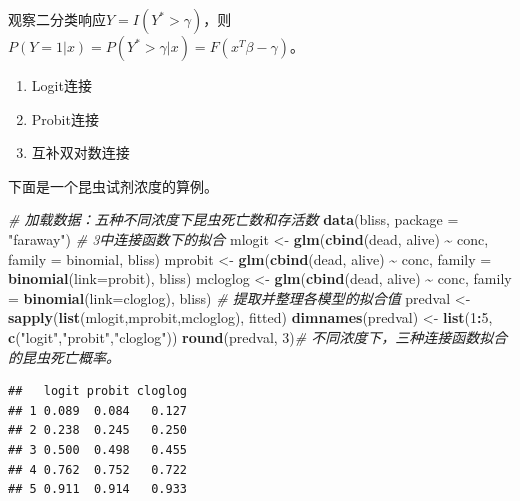 \documentclass[
]{book}
\newenvironment{Shaded}{\begin{snugshade}}{\end{snugshade}}
\newcommand{\AttributeTok}[1]{\textcolor[rgb]{0.13,0.29,0.53}{#1}}
\newcommand{\CommentTok}[1]{\textcolor[rgb]{0.56,0.35,0.01}{\textit{#1}}}
\newcommand{\DecValTok}[1]{\textcolor[rgb]{0.00,0.00,0.81}{#1}}
\newcommand{\FunctionTok}[1]{\textcolor[rgb]{0.13,0.29,0.53}{\textbf{#1}}}
\newcommand{\NormalTok}[1]{#1}
\newcommand{\OtherTok}[1]{\textcolor[rgb]{0.56,0.35,0.01}{#1}}
\newcommand{\SpecialCharTok}[1]{\textcolor[rgb]{0.81,0.36,0.00}{\textbf{#1}}}
\newcommand{\StringTok}[1]{\textcolor[rgb]{0.31,0.60,0.02}{#1}}
\providecommand{\tightlist}{%
  \setlength{\itemsep}{0pt}\setlength{\parskip}{0pt}}
\begin{document}
观察二分类响应\(Y = I(Y^* > \gamma)\)，则\(P(Y=1|x) = P(Y^* > \gamma|x) = F(x^T\beta - \gamma)\)。

\begin{enumerate}
\def\labelenumi{\arabic{enumi}.}
\tightlist
\item
  Logit连接
\item
  Probit连接
\item
  互补双对数连接
\end{enumerate}

下面是一个昆虫试剂浓度的算例。

\begin{Shaded}
\begin{Highlighting}[]
\CommentTok{\# 加载数据：五种不同浓度下昆虫死亡数和存活数}
\FunctionTok{data}\NormalTok{(bliss, }\AttributeTok{package =} \StringTok{"faraway"}\NormalTok{)}
\CommentTok{\# 3中连接函数下的拟合}
\NormalTok{mlogit }\OtherTok{\textless{}{-}} \FunctionTok{glm}\NormalTok{(}\FunctionTok{cbind}\NormalTok{(dead, alive) }\SpecialCharTok{\textasciitilde{}}\NormalTok{ conc, }\AttributeTok{family =}\NormalTok{ binomial, bliss)}
\NormalTok{mprobit }\OtherTok{\textless{}{-}} \FunctionTok{glm}\NormalTok{(}\FunctionTok{cbind}\NormalTok{(dead, alive) }\SpecialCharTok{\textasciitilde{}}\NormalTok{ conc, }\AttributeTok{family =} \FunctionTok{binomial}\NormalTok{(}\AttributeTok{link=}\NormalTok{probit), bliss)}
\NormalTok{mcloglog }\OtherTok{\textless{}{-}} \FunctionTok{glm}\NormalTok{(}\FunctionTok{cbind}\NormalTok{(dead, alive) }\SpecialCharTok{\textasciitilde{}}\NormalTok{ conc, }\AttributeTok{family =} \FunctionTok{binomial}\NormalTok{(}\AttributeTok{link=}\NormalTok{cloglog), bliss)}
\CommentTok{\# 提取并整理各模型的拟合值}
\NormalTok{predval }\OtherTok{\textless{}{-}} \FunctionTok{sapply}\NormalTok{(}\FunctionTok{list}\NormalTok{(mlogit,mprobit,mcloglog), fitted)}
\FunctionTok{dimnames}\NormalTok{(predval) }\OtherTok{\textless{}{-}} \FunctionTok{list}\NormalTok{(}\DecValTok{1}\SpecialCharTok{:}\DecValTok{5}\NormalTok{, }\FunctionTok{c}\NormalTok{(}\StringTok{"logit"}\NormalTok{,}\StringTok{"probit"}\NormalTok{,}\StringTok{"cloglog"}\NormalTok{))}
\FunctionTok{round}\NormalTok{(predval, }\DecValTok{3}\NormalTok{)}\CommentTok{\# 不同浓度下，三种连接函数拟合的昆虫死亡概率。}
\end{Highlighting}
\end{Shaded}

\begin{verbatim}
##   logit probit cloglog
## 1 0.089  0.084   0.127
## 2 0.238  0.245   0.250
## 3 0.500  0.498   0.455
## 4 0.762  0.752   0.722
## 5 0.911  0.914   0.933
\end{verbatim}
\end{document}
